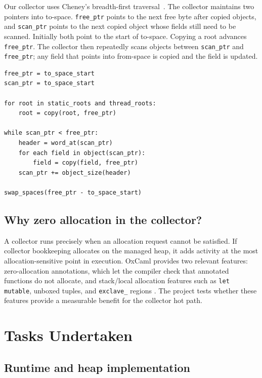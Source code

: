 \documentclass[11pt,a4paper]{article}
\begin{document}
Our collector uses Cheney's breadth-first traversal~\cite{cheney1970}.  The
collector maintains two pointers into to-space.  \texttt{free\_ptr} points to
the next free byte after copied objects, and \texttt{scan\_ptr} points to the
next copied object whose fields still need to be scanned.  Initially both point
to the start of to-space.  Copying a root advances \texttt{free\_ptr}.  The
collector then repeatedly scans objects between \texttt{scan\_ptr} and
\texttt{free\_ptr}; any field that points into from-space is copied and the
field is updated.

\begin{lstlisting}[caption={Cheney-style traversal used by every variant.},label={lst:cheney}]
free_ptr = to_space_start
scan_ptr = to_space_start

for root in static_roots and thread_roots:
    root = copy(root, free_ptr)

while scan_ptr < free_ptr:
    header = word_at(scan_ptr)
    for each field in object(scan_ptr):
        field = copy(field, free_ptr)
    scan_ptr += object_size(header)

swap_spaces(free_ptr - to_space_start)
\end{lstlisting}

\subsection{Why zero allocation in the collector?}

A collector runs precisely when an allocation request cannot be satisfied.  If
collector bookkeeping allocates on the managed heap, it adds activity at the
most allocation-sensitive point in execution.  OxCaml provides two relevant
features: zero-allocation annotations, which let the compiler check that
annotated functions do not allocate, and stack/local allocation features such as
\texttt{let mutable}, unboxed tuples, and \texttt{exclave\_} regions
\cite{oxcamlStackIntro,oxcamlStackReference}.  The project tests whether these
features provide a measurable benefit for the collector hot path.

\section{Tasks Undertaken}
\label{sec:tasks}

\subsection{Runtime and heap implementation}
\end{document}
